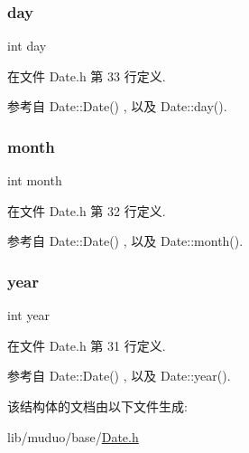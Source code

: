 \subsubsection{\texorpdfstring{day}{day}}
{\footnotesize\ttfamily int day}



在文件 Date.\+h 第 33 行定义.



参考自 Date\+::\+Date() , 以及 Date\+::day().

\mbox{\label{structmuduo_1_1Date_1_1YearMonthDay_aedb06abe5aff12fa3e7e0e71a374edfb}} 
\subsubsection{\texorpdfstring{month}{month}}
{\footnotesize\ttfamily int month}



在文件 Date.\+h 第 32 行定义.



参考自 Date\+::\+Date() , 以及 Date\+::month().

\mbox{\label{structmuduo_1_1Date_1_1YearMonthDay_abeac221e38b7b9ce7df8722c842bf671}} 
\subsubsection{\texorpdfstring{year}{year}}
{\footnotesize\ttfamily int year}



在文件 Date.\+h 第 31 行定义.



参考自 Date\+::\+Date() , 以及 Date\+::year().



该结构体的文档由以下文件生成\+:\begin{DoxyCompactItemize}
\item 
lib/muduo/base/\hyperlink{Date_8h}{Date.\+h}\end{DoxyCompactItemize}
